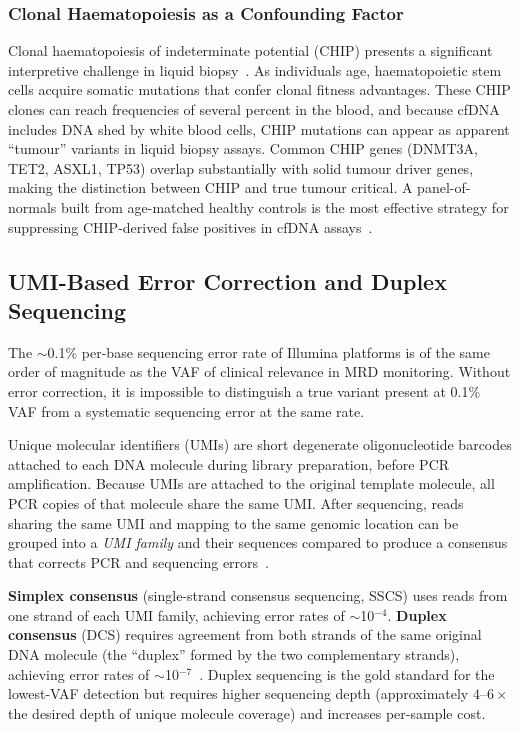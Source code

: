 \subsubsection{Clonal Haematopoiesis as a Confounding Factor}

Clonal haematopoiesis of indeterminate potential (CHIP) presents a significant
interpretive challenge in liquid biopsy~\cite{blasco2015chip}.  As individuals
age, haematopoietic stem cells acquire somatic mutations that confer clonal
fitness advantages.  These CHIP clones can reach frequencies of several percent
in the blood, and because cfDNA includes DNA shed by white blood cells, CHIP
mutations can appear as apparent ``tumour'' variants in liquid biopsy assays.
Common CHIP genes (DNMT3A, TET2, ASXL1, TP53) overlap substantially with solid
tumour driver genes, making the distinction between CHIP and true tumour
\ctDNA{} critical.  A panel-of-normals built from age-matched healthy controls
is the most effective strategy for suppressing CHIP-derived false positives in
cfDNA assays~\cite{blasco2015chip}.

\subsection{UMI-Based Error Correction and Duplex Sequencing}

The $\sim$0.1\% per-base sequencing error rate of Illumina platforms is of
the same order of magnitude as the VAF of clinical relevance in MRD monitoring.
Without error correction, it is impossible to distinguish a true variant present
at 0.1\% VAF from a systematic sequencing error at the same rate.

Unique molecular identifiers (UMIs) are short degenerate oligonucleotide barcodes
attached to each DNA molecule during library preparation, before PCR amplification.
Because UMIs are attached to the original template molecule, all PCR copies of
that molecule share the same UMI.  After sequencing, reads sharing the same UMI
and mapping to the same genomic location can be grouped into a \emph{UMI family}
and their sequences compared to produce a consensus that corrects PCR and
sequencing errors~\cite{schmitt2012detection}.

\textbf{Simplex consensus} (single-strand consensus sequencing, SSCS) uses reads
from one strand of each UMI family, achieving error rates of $\sim$10$^{-4}$.
\textbf{Duplex consensus} (DCS) requires agreement from both strands of the same
original DNA molecule (the ``duplex'' formed by the two complementary strands),
achieving error rates of $\sim$10$^{-7}$~\cite{kennedy2014detecting}.  Duplex
sequencing is the gold standard for the lowest-VAF detection but requires higher
sequencing depth (approximately $4\text{--}6\times$ the desired depth of unique
molecule coverage) and increases per-sample cost.

